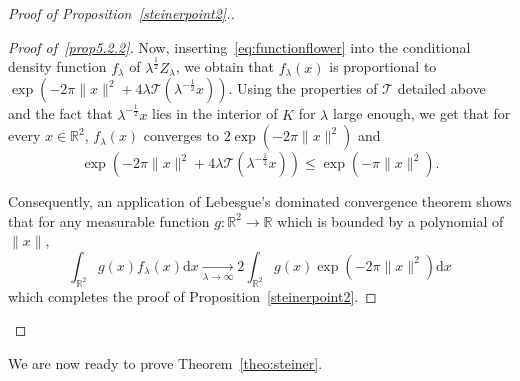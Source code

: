 \documentclass[AHL,Unicode,longabstracts,published]{cedram}
\newcommand{\cT}{\mathcal{T}}
\newcommand{\dd}{\mathrm{d}}
\newcommand{\R}{\mathbb{R}}
\newcommand{\pass}{\vspace{0.3cm}\noindent}
\newcommand{\noi}{\noindent}
\newenvironment*{lastprooff}{\begin{proof}}{\end{proof}}
\newcommand{\R}{\mathbb{R}}
\begin{document}
\begin{proof}[{Proof of Proposition~\ref{steinerpoint2}.}]
\begin{lastprooff}[{Proof of~\eqref{prop5.2.2}}]
Now, inserting~\eqref{eq:functionflower} into the conditional density function $f_{\lambda}$ of $\lambda^{\frac12}Z_\lambda$, we obtain that $f_{\lambda}(x)$ is proportional to $\exp(-2\pi\|x\|^2+4\lambda{\cT}(\lambda^{-\frac12}x))$. Using the properties of $\cT$ detailed above and the fact that $\lambda^{-\frac{1}{2}}x$ lies in the interior of $K$ for $\lambda$ large enough, we get that for every $x\in\R^2$, $f_\lambda(x)$ converges to $2\exp(-2\pi\|x\|^2)$ and
\begin{equation*}
\exp\left(-2\pi\|x\|^2+4\lambda{\cT}\left(\lambda^{-\frac12}x\right)\right)\le \exp\left(-\pi\|x\|^2\right).
\end{equation*}

Consequently, an application of Lebesgue's dominated convergence theorem shows that for any measurable function $g:\R^2\longrightarrow \R$ which is bounded by a polynomial of~$\|x\|$,
\begin{equation*}
\int_{\R^2} g(x)f_\lambda(x)\dd x \underset{\lambda\to\infty}{\longrightarrow} 2\int_{\R^2} g(x)\exp(-2\pi\|x\|^2)\dd x
\end{equation*}
which completes the proof of Proposition~\ref{steinerpoint2}.
\end{lastprooff}\let\qed\relax
\end{proof}

We are now ready to prove Theorem~\ref{theo:steiner}.
\end{document}
